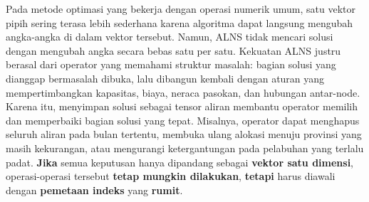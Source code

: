 \documentclass{file/TA-ITS}
\theoremstyle{definition}
\theoremstyle{definition}
\theoremstyle{plain}
\begin{document}
Pada metode optimasi yang bekerja dengan operasi numerik umum, satu vektor pipih sering terasa lebih sederhana karena algoritma dapat langsung mengubah angka-angka di dalam vektor tersebut. Namun, ALNS tidak mencari solusi dengan mengubah angka secara bebas satu per satu. Kekuatan ALNS justru berasal dari operator yang memahami struktur masalah: bagian solusi yang dianggap bermasalah dibuka, lalu dibangun kembali dengan aturan yang mempertimbangkan kapasitas, biaya, neraca pasokan, dan hubungan antar-node. Karena itu, menyimpan solusi sebagai tensor aliran membantu operator memilih dan memperbaiki bagian solusi yang tepat. Misalnya, operator dapat menghapus seluruh aliran pada bulan tertentu, membuka ulang alokasi menuju provinsi yang masih kekurangan, atau mengurangi ketergantungan pada pelabuhan yang terlalu padat. \textbf{Jika} semua keputusan hanya dipandang sebagai \textbf{vektor satu dimensi}, operasi-operasi tersebut \textbf{tetap mungkin dilakukan}, \textbf{tetapi} harus diawali dengan \textbf{pemetaan indeks} yang \textbf{rumit}.
\end{document}
